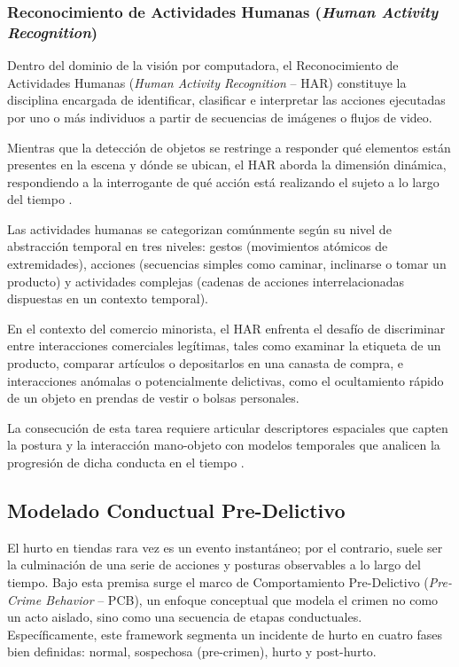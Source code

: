 \subsubsection{Reconocimiento de Actividades Humanas (\textit{Human Activity Recognition})}

Dentro del dominio de la visión por computadora, el Reconocimiento de Actividades Humanas (\textit{Human Activity Recognition} -- HAR) constituye la disciplina encargada de identificar, clasificar e interpretar las acciones ejecutadas por uno o más individuos a partir de secuencias de imágenes o flujos de video.

Mientras que la detección de objetos se restringe a responder qué elementos están presentes en la escena y dónde se ubican, el HAR aborda la dimensión dinámica, respondiendo a la interrogante de qué acción está realizando el sujeto a lo largo del tiempo \cite{ansari_optimized_2023}.

Las actividades humanas se categorizan comúnmente según su nivel de abstracción temporal en tres niveles: gestos (movimientos atómicos de extremidades), acciones (secuencias simples como caminar, inclinarse o tomar un producto) y actividades complejas (cadenas de acciones interrelacionadas dispuestas en un contexto temporal).

En el contexto del comercio minorista, el HAR enfrenta el desafío de discriminar entre interacciones comerciales legítimas, tales como examinar la etiqueta de un producto, comparar artículos o depositarlos en una canasta de compra, e interacciones anómalas o potencialmente delictivas, como el ocultamiento rápido de un objeto en prendas de vestir o bolsas personales.

La consecución de esta tarea requiere articular descriptores espaciales que capten la postura y la interacción mano-objeto con modelos temporales que analicen la progresión de dicha conducta en el tiempo \cite{chinthulla_deep_2025}.

\subsection{Modelado Conductual Pre-Delictivo}

El hurto en tiendas rara vez es un evento instantáneo; por el contrario, suele ser la culminación de una serie de acciones y posturas observables a lo largo del tiempo. Bajo esta premisa surge el marco de Comportamiento Pre-Delictivo (\textit{Pre-Crime Behavior} -- PCB), un enfoque conceptual que modela el crimen no como un acto aislado, sino como una secuencia de etapas conductuales. Específicamente, este framework segmenta un incidente de hurto en cuatro fases bien definidas: normal, sospechosa (pre-crimen), hurto y post-hurto.

